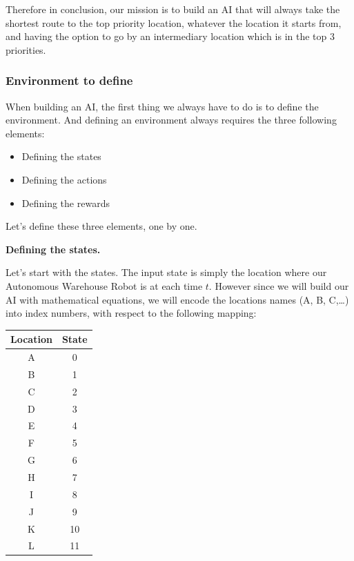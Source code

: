 \documentclass[]{book}
\begin{document}
Therefore in conclusion, our mission is to build an AI that will always take the shortest route to the top priority location, whatever the location it starts from, and having the option to go by an intermediary location which is in the top 3 priorities.

\subsubsection{Environment to define}

When building an AI, the first thing we always have to do is to define the environment. And defining an environment always requires the three following elements:

\begin{itemize}
    \item Defining the states
    \item Defining the actions
    \item Defining the rewards
\end{itemize}

Let's define these three elements, one by one.

\textbf{Defining the states.}

Let's start with the states. The input state is simply the location where our Autonomous Warehouse Robot is at each time \(t\). However since we will build our AI with mathematical equations, we will encode the locations names (A, B, C,\ldots{}) into index numbers, with respect to the following mapping:

\begin{table}[h!]
  \begin{center}
    \begin{tabular}{c|c}
      \textbf{Location} & \textbf{State} \\
      \hline
      A & 0 \\
      B & 1 \\
      C & 2 \\
      D & 3 \\
      E & 4 \\
      F & 5 \\
      G & 6 \\
      H & 7 \\
      I & 8 \\
      J & 9 \\
      K & 10 \\
      L & 11 \\
    \end{tabular}
  \end{center}
\end{table}
\end{document}
